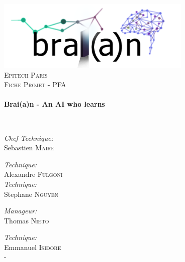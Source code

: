 \begin{titlepage}
  \begin{center}

    \includegraphics[width=0.7\textwidth]{braian}~\\[1cm]

    \textsc{\LARGE Epitech Paris}\\[1.5cm]

    \textsc{\Large Fiche Projet - PFA}\\[0.5cm]

    \HRule \\[0.4cm]
    { \huge \bfseries Brai(a)n - An AI who learns \\[0.4cm] }

    \HRule \\[1.5cm]

    \noindent

    \begin{multicols}{3}
      \emph{Chef Technique:}\\
      Sebastien \textsc{Maire} \\

      \vspace{1cm}

      \emph{Technique:} \\
      Alexandre \textsc{Fulgoni} \\

      \emph{Technique:} \\
      Stephane \textsc{Nguyen} \\

      \vspace{1cm}

      \emph{Manageur:} \\
      Thomas \textsc{Nieto} \\

      \vspace{1cm}

      \emph{Technique:} \\
      Emmanuel \textsc{Isidore} \\

      \vspace{1cm}
      -
   \end{multicols}


\end{center}
\end{titlepage}
